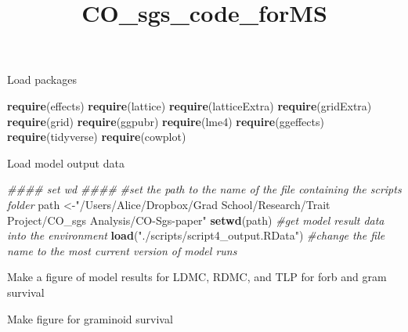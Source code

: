 \documentclass[
]{article}
\title{CO\_sgs\_code\_forMS}
\author{}
\date{\vspace{-2.5em}}
\newenvironment{Shaded}{\begin{snugshade}}{\end{snugshade}}
\newcommand{\CommentTok}[1]{\textcolor[rgb]{0.56,0.35,0.01}{\textit{#1}}}
\newcommand{\KeywordTok}[1]{\textcolor[rgb]{0.13,0.29,0.53}{\textbf{#1}}}
\newcommand{\NormalTok}[1]{#1}
\newcommand{\StringTok}[1]{\textcolor[rgb]{0.31,0.60,0.02}{#1}}
\begin{document}
\maketitle

Load packages

\begin{Shaded}
\begin{Highlighting}[]
\KeywordTok{require}\NormalTok{(effects)}
\KeywordTok{require}\NormalTok{(lattice)}
\KeywordTok{require}\NormalTok{(latticeExtra)}
\KeywordTok{require}\NormalTok{(gridExtra)}
\KeywordTok{require}\NormalTok{(grid)}
\KeywordTok{require}\NormalTok{(ggpubr)}
\KeywordTok{require}\NormalTok{(lme4)}
\KeywordTok{require}\NormalTok{(ggeffects)}
\KeywordTok{require}\NormalTok{(tidyverse)}
\KeywordTok{require}\NormalTok{(cowplot)}
\end{Highlighting}
\end{Shaded}

Load model output data

\begin{Shaded}
\begin{Highlighting}[]
\CommentTok{\#\#\#\# set wd \#\#\#\#}
\CommentTok{\#set the path to the name of the file containing the \textquotesingle{}scripts\textquotesingle{} folder}
\NormalTok{path \textless{}{-}}\StringTok{"/Users/Alice/Dropbox/Grad School/Research/Trait Project/CO\_sgs Analysis/CO{-}Sgs{-}paper"}
\KeywordTok{setwd}\NormalTok{(path)}
\CommentTok{\#get model result data into the environment}
\KeywordTok{load}\NormalTok{(}\StringTok{"./scripts/script4\_output.RData"}\NormalTok{) }\CommentTok{\#change the file name to the most current version of model runs}
\end{Highlighting}
\end{Shaded}

Make a figure of model results for LDMC, RDMC, and TLP for forb and gram
survival

Make figure for graminoid survival
\end{document}
